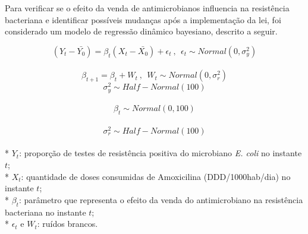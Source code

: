 \documentclass[
]{book}
\newenvironment{Shaded}{\begin{snugshade}}{\end{snugshade}}
\newcommand{\CommentTok}[1]{\textcolor[rgb]{0.56,0.35,0.01}{\textit{#1}}}
\newcommand{\DataTypeTok}[1]{\textcolor[rgb]{0.13,0.29,0.53}{#1}}
\newcommand{\DecValTok}[1]{\textcolor[rgb]{0.00,0.00,0.81}{#1}}
\newcommand{\KeywordTok}[1]{\textcolor[rgb]{0.13,0.29,0.53}{\textbf{#1}}}
\newcommand{\NormalTok}[1]{#1}
\newcommand{\OperatorTok}[1]{\textcolor[rgb]{0.81,0.36,0.00}{\textbf{#1}}}
\newcommand{\StringTok}[1]{\textcolor[rgb]{0.31,0.60,0.02}{#1}}
\begin{document}
Para verificar se o efeito da venda de antimicrobianos influencia na resistência
bacteriana e identificar possíveis mudanças após a implementação da lei, foi considerado um modelo de regressão dinâmico bayesiano, descrito a seguir.

\[(Y_t-\bar{Y_0}) = \beta_t (X_t-\bar{X_0}) + \epsilon_t ~,~~ \epsilon_t \sim Normal(0,\sigma_y^2)\]\\
\[\beta_{t+1} = \beta_t + W_t ~,~~ W_t \sim Normal(0,\sigma_r^2)\]
\[\sigma_y^2 \sim Half-Normal(100)\]\\
\[\beta_t \sim Normal(0,100)\]\\
\[\sigma_r^2 \sim Half-Normal(100)\]\\
* \(Y_t\): proporção de testes de resistência positiva do microbiano \emph{E. coli} no instante \(t\);\\
* \(X_t\): quantidade de doses consumidas de Amoxicilina (DDD/1000hab/dia) no instante \(t\);\\
* \(\beta_t\): parâmetro que representa o efeito da venda do antimicrobiano na resistência bacteriana no instante \(t\);\\
* \(\epsilon_t\) e \(W_t\): ruídos brancos.

\begin{Shaded}
\end{Shaded}
\end{document}
